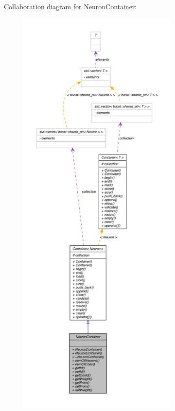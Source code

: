 Collaboration diagram for NeuronContainer:\nopagebreak
\begin{figure}[H]
\begin{center}
\leavevmode
\includegraphics[height=600pt]{class_neuron_container__coll__graph}
\end{center}
\end{figure}
